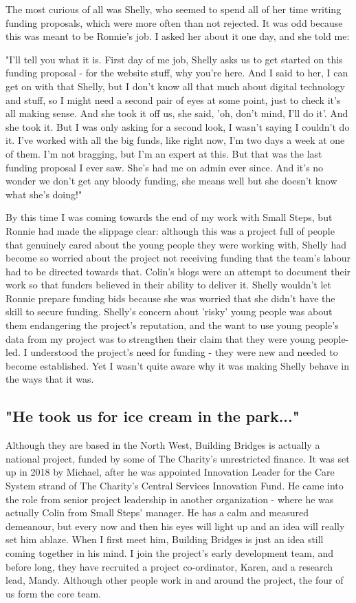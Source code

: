 The most curious of all was Shelly, who seemed to spend all of her time writing funding proposals, which were more often than not rejected. It was odd because this was meant to be Ronnie's job. I asked her about it one day, and she told me:

"I'll tell you what it is. First day of me job, Shelly asks us to get started on this funding proposal - for the website stuff, why you're here. And I said to her, I can get on with that Shelly, but I don't know all that much about digital technology and stuff, so I might need a second pair of eyes at some point, just to check it's all making sense. And she took it off us, she said, 'oh, don't mind, I'll do it'. And she took it. But I was only asking for a second look, I wasn't saying I couldn't do it. I've worked with all the big funds, like right now, I'm two days a week at one of them. I'm not bragging, but I'm an expert at this. But that was the last funding proposal I ever saw. She's had me on admin ever since. And it's no wonder we don't get any bloody funding, she means well but she doesn't know what she's doing!"

By this time I was coming towards the end of my work with Small Steps, but Ronnie had made the slippage clear: although this was a project full of people that genuinely cared about the young people they were working with, Shelly had become so worried about the project not receiving funding that the team's labour had to be directed towards that. Colin's blogs were an attempt to document their work so that funders believed in their ability to deliver it. Shelly wouldn't let Ronnie prepare funding bids because she was worried that she didn't have the skill to secure funding. Shelly's concern about 'risky' young people was about them endangering the project's reputation, and the want to use young people's data from my project was to strengthen their claim that they were young people-led. I understood the project's need for funding - they were new and needed to become established. Yet I wasn't quite aware why it was making Shelly behave in the ways that it was. 

\subsection{"He took us for ice cream in the park..."}
Although they are based in the North West, Building Bridges is actually a national project, funded by some of The Charity's unrestricted finance. It was set up in 2018 by Michael, after he was appointed Innovation Leader for the Care System strand of The Charity's Central Services Innovation Fund. He came into the role from senior project leadership in another organization - where he was actually Colin from Small Steps' manager. He has a calm and measured demeanour, but every now and then his eyes will light up and an idea will really set him ablaze. When I first meet him, Building Bridges is just an idea still coming together in his mind. I join the project's early development team, and before long, they have recruited a project co-ordinator, Karen, and a research lead, Mandy. Although other people work in and around the project, the four of us form the core team. 

